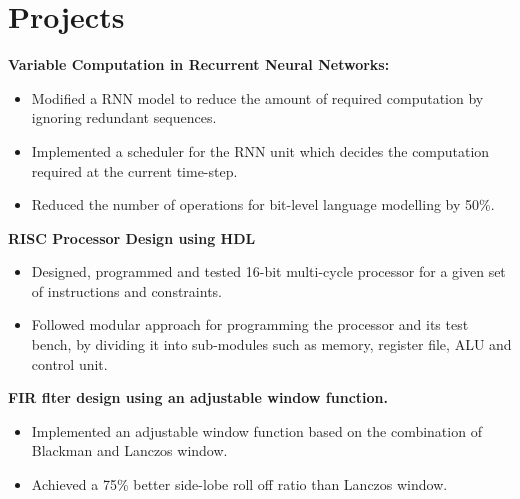 \section{Projects}

{\textbf{Variable Computation in Recurrent Neural Networks:}
        \begin{itemize}
        \item Modified a RNN model to reduce the amount of required computation by ignoring redundant sequences.
        \item Implemented a scheduler for the RNN unit which decides the computation required at the current time-step.
        \item Reduced the number of operations for bit-level language modelling by 50\%.
    \end{itemize}
}

{\textbf{RISC Processor Design using HDL}
\begin{itemize}
    \item Designed, programmed and tested 16-bit multi-cycle processor for a given set of instructions and constraints.
    \item Followed modular approach for programming the processor and its test bench, by dividing it into sub-modules such as memory, register file, ALU and control unit.
\end{itemize}
}

{\textbf{FIR flter design using an adjustable window function.}
\begin{itemize}
    \item Implemented an adjustable window function based on the combination of Blackman and Lanczos window.
    \item Achieved a 75\% better side-lobe roll off ratio than Lanczos window.
\end{itemize}
}
